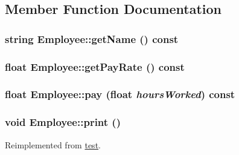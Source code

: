 \subsection{Member Function Documentation}
\hypertarget{class_employee_ab21f76396041c5ea51b5359aa76361e3}{
\subsubsection[{getName}]{\setlength{\rightskip}{0pt plus 5cm}string Employee::getName () const}}
\label{class_employee_ab21f76396041c5ea51b5359aa76361e3}
\hypertarget{class_employee_a05cf3feeb14354a9966420ad191e53b1}{
\subsubsection[{getPayRate}]{\setlength{\rightskip}{0pt plus 5cm}float Employee::getPayRate () const}}
\label{class_employee_a05cf3feeb14354a9966420ad191e53b1}
\hypertarget{class_employee_a99c934c41b73b1bd595687d619a8e7e7}{
\subsubsection[{pay}]{\setlength{\rightskip}{0pt plus 5cm}float Employee::pay (float {\em hoursWorked}) const}}
\label{class_employee_a99c934c41b73b1bd595687d619a8e7e7}
\hypertarget{class_employee_a79556ad700627dba88049f487a34a762}{
\subsubsection[{print}]{\setlength{\rightskip}{0pt plus 5cm}void Employee::print ()}}
\label{class_employee_a79556ad700627dba88049f487a34a762}


Reimplemented from \hyperlink{classtest_a861706972dfd4e400a59f3d13e4f3710}{test}.

